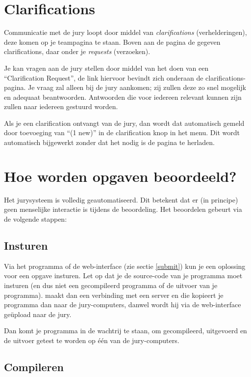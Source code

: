 \section{Clarifications}

Communicatie met de jury loopt door middel van \emph{clarifications}
(verhelderingen), deze komen op je teampagina te staan. Boven aan de
pagina de gegeven clarifications, daar onder je \emph{requests} (verzoeken).

Je kan vragen aan de jury stellen door middel van het doen van een
``Clarification Request'', de link hiervoor bevindt zich onderaan de
clarifications-pagina.  Je vraag zal alleen bij de jury aankomen; zij
zullen deze zo snel mogelijk en adequaat beantwoorden. Antwoorden die
voor iedereen relevant kunnen zijn zullen naar iedereen gestuurd worden.

Als je een clarification ontvangt van de jury, dan wordt dat
automatisch gemeld door toevoeging van ``(1 new)'' in de clarification
knop in het menu. Dit wordt automatisch bijgewerkt zonder dat het nodig
is de pagina te herladen.

\section{Hoe worden opgaven beoordeeld?}

Het \DOMjudge jurysysteem is volledig geautomatiseerd. Dit betekent
dat er (in principe) geen menselijke interactie is tijdens de
beoordeling. Het beoordelen gebeurt via de volgende stappen:

\subsection{Insturen}

Via het  programma of de web-interface (zie sectie
\ref{submit}) kun je een oplossing voor een opgave insturen. Let op
dat je de source-code van je programma moet insturen (en dus niet een
gecompileerd programma of de uitvoer van je programma). 
maakt dan een verbinding met een server en die kopieert je programma
dan naar de jury-computers, danwel wordt hij via de web-interface
ge\"upload naar de jury.

Dan komt je programma in de wachtrij te staan, om gecompileerd,
uitgevoerd en de uitvoer getest te worden op \'e\'en van de
jury-computers.

\subsection{Compileren}

